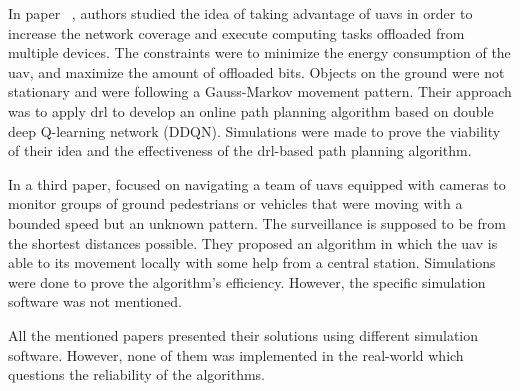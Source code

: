 \documentclass[../main.tex]{subfiles}
\begin{document}

In paper ~\cite{pen21}, authors \citeauthor{pen21} studied the idea of taking advantage of \glspl{uav} in order to increase the network coverage and execute computing tasks offloaded from multiple devices. 
The constraints were to minimize the energy consumption of the \gls{uav}, and maximize the amount of offloaded bits. 
Objects on the ground were not stationary and were following a Gauss-Markov movement pattern. Their approach was to apply \gls{drl} to develop an online path planning algorithm based on double deep Q-learning network (DDQN).
Simulations were made to prove the viability of their idea and the effectiveness of the \gls{drl}-based path planning algorithm.

In a third paper, \citeauthor{hua21} focused on navigating a team of \glspl{uav} equipped with cameras to monitor groups of ground pedestrians or vehicles that were moving with a bounded speed but an unknown pattern. 
The surveillance is supposed to be from the shortest distances possible. 
They proposed an algorithm in which the \gls{uav} is able to its movement locally with some help from a central station.
Simulations were done to prove the algorithm's efficiency. However, the specific simulation software was not mentioned. 

All the mentioned papers presented their solutions using different simulation software. However, none of them was implemented in the real-world which questions the reliability of the algorithms.




\end{document}
